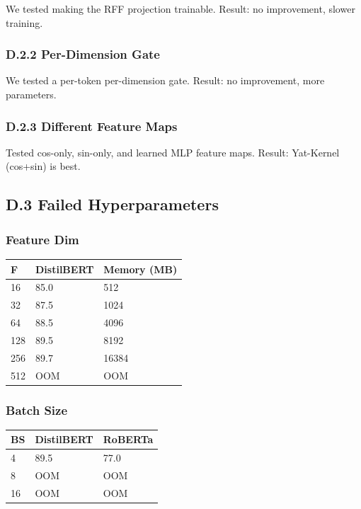 We tested making the RFF projection trainable. Result: no improvement, 
slower training.

\subsubsection{D.2.2 Per-Dimension Gate}

We tested a per-token per-dimension gate. Result: no improvement, more 
parameters.

\subsubsection{D.2.3 Different Feature Maps}

Tested cos-only, sin-only, and learned MLP feature maps. Result: 
Yat-Kernel (cos+sin) is best.

\subsection{D.3 Failed Hyperparameters}

\subsubsection{Feature Dim}

\begin{table}[H]
\centering
\small
\begin{tabular}{lll}
\toprule
\textbf{F} & \textbf{DistilBERT} & \textbf{Memory (MB)} \\
\midrule
16 & 85.0 & 512 \\
32 & 87.5 & 1024 \\
64 & 88.5 & 4096 \\
128 & 89.5 & 8192 \\
256 & 89.7 & 16384 \\
512 & OOM & OOM \\
\bottomrule
\end{tabular}
\end{table}

\subsubsection{Batch Size}

\begin{table}[H]
\centering
\small
\begin{tabular}{lll}
\toprule
\textbf{BS} & \textbf{DistilBERT} & \textbf{RoBERTa} \\
\midrule
4 & 89.5 & 77.0 \\
8 & OOM & OOM \\
16 & OOM & OOM \\
\bottomrule
\end{tabular}
\end{table}

